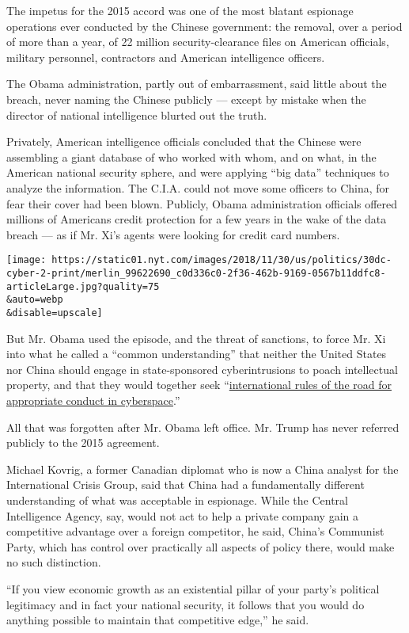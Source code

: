 The impetus for the 2015 accord was one of the most blatant espionage
operations ever conducted by the Chinese government: the removal, over a
period of more than a year, of 22 million security-clearance files on
American officials, military personnel, contractors and American
intelligence officers.

The Obama administration, partly out of embarrassment, said little about
the breach, never naming the Chinese publicly --- except by mistake when
the director of national intelligence blurted out the truth.

Privately, American intelligence officials concluded that the Chinese
were assembling a giant database of who worked with whom, and on what,
in the American national security sphere, and were applying ``big data''
techniques to analyze the information. The C.I.A. could not move some
officers to China, for fear their cover had been blown. Publicly, Obama
administration officials offered millions of Americans credit protection
for a few years in the wake of the data breach --- as if Mr. Xi's agents
were looking for credit card numbers.

\texttt{[image: https://static01.nyt.com/images/2018/11/30/us/politics/30dc-cyber-2-print/merlin\_99622690\_c0d336c0-2f36-462b-9169-0567b11ddfc8-articleLarge.jpg?quality=75\\\&auto=webp\\\&disable=upscale]}

But Mr. Obama used the episode, and the threat of sanctions, to force
Mr. Xi into what he called a ``common understanding'' that neither the
United States nor China should engage in state-sponsored cyberintrusions
to poach intellectual property, and that they would together seek
``\href{https://www.nytimes.com/2015/09/26/world/asia/xi-jinping-white-house.html}{international
rules of the road for appropriate conduct in cyberspace}.''

All that was forgotten after Mr. Obama left office. Mr. Trump has never
referred publicly to the 2015 agreement.

Michael Kovrig, a former Canadian diplomat who is now a China analyst
for the International Crisis Group, said that China had a fundamentally
different understanding of what was acceptable in espionage. While the
Central Intelligence Agency, say, would not act to help a private
company gain a competitive advantage over a foreign competitor, he said,
China's Communist Party, which has control over practically all aspects
of policy there, would make no such distinction.

``If you view economic growth as an existential pillar of your party's
political legitimacy and in fact your national security, it follows that
you would do anything possible to maintain that competitive edge,'' he
said.

